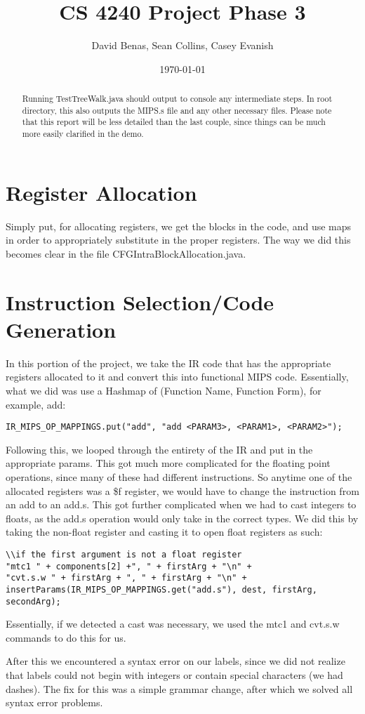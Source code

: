 \documentclass[a4paper]{article}
\title{CS 4240 Project Phase 3}
\author{David Benas, Sean Collins, Casey Evanish}
\date{\today}
\begin{document}
\maketitle

\begin{abstract}
Running TestTreeWalk.java should output to console any intermediate steps. In root directory, this also outputs the MIPS.s file and any other necessary files. Please note that this report will be less detailed than the last couple, since things can be much more easily clarified in the demo.
\end{abstract}

\section{Register Allocation}
Simply put, for allocating registers, we get the blocks in the code, and use maps in order to appropriately substitute in the proper registers. The way we did this becomes clear in the file CFGIntraBlockAllocation.java. 
\section{Instruction Selection/Code Generation}

In this portion of the project, we take the IR code that has the appropriate registers allocated to it and convert this into functional MIPS code. Essentially, what we did was use a Hashmap of (Function Name, Function Form), for example, add: 
\begin{verbatim}
IR_MIPS_OP_MAPPINGS.put("add", "add <PARAM3>, <PARAM1>, <PARAM2>");
\end{verbatim}

Following this, we looped through the entirety of the IR and put in the appropriate params. This got much more complicated for the floating point operations, since many of these had different instructions. So anytime one of the allocated registers was a \$f register, we would have to change the instruction from an add to an add.s. This got further complicated when we had to cast integers to floats, as the add.s operation would only take in the correct types. We did this by taking the non-float register and casting it to open float registers as such: 
\begin{verbatim}
\\if the first argument is not a float register
"mtc1 " + components[2] +", " + firstArg + "\n" +
"cvt.s.w " + firstArg + ", " + firstArg + "\n" +
insertParams(IR_MIPS_OP_MAPPINGS.get("add.s"), dest, firstArg, secondArg);
\end{verbatim}

Essentially, if we detected a cast was necessary, we used the mtc1 and cvt.s.w commands to do this for us.

After this we encountered a syntax error on our labels, since we did not realize that labels could not begin with integers or contain special characters (we had dashes). The fix for this was a simple grammar change, after which we solved all syntax error problems.
\end{document}
